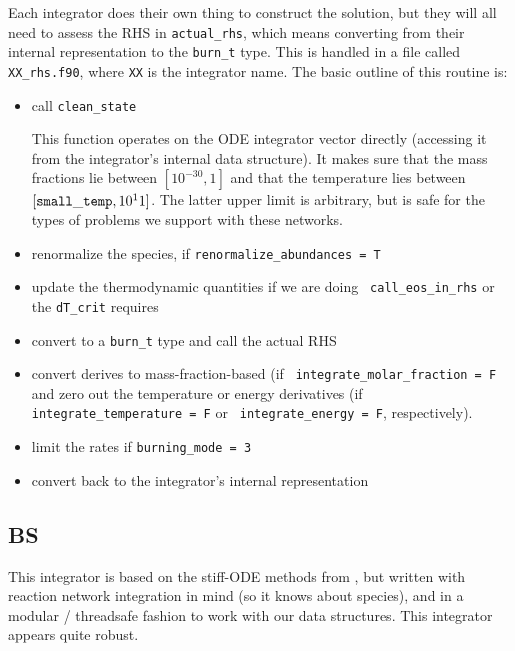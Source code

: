     
Each integrator does their own thing to construct the solution, 
but they will all need to assess the RHS in {\tt actual\_rhs},
which means converting from their internal representation
to the {\tt burn\_t} type.  This is handled in a file
called {\tt XX\_rhs.f90}, where {\tt XX} is the integrator name.
The basic outline of this routine is:
\begin{itemize}
\item call {\tt clean\_state}

This function operates on the ODE integrator vector directly
(accessing it from the integrator's internal data structure).  It
makes sure that the mass fractions lie between $[10^{-30}, 1]$ and
that the temperature lies between $[{\tt small\_temp}, 10^11]$.  The
latter upper limit is arbitrary, but is safe for the types of problems
we support with these networks.


\item renormalize the species, if {\tt renormalize\_abundances = T}

\item update the thermodynamic quantities if we are doing {\tt
  call\_eos\_in\_rhs} or the {\tt dT\_crit} requires

\item convert to a {\tt burn\_t} type and call the actual RHS

\item convert derives to mass-fraction-based (if {\tt
  integrate\_molar\_fraction = F} and zero out the temperature or
  energy derivatives (if {\tt integrate\_temperature = F} or {\tt
    integrate\_energy = F}, respectively).

\item limit the rates if {\tt burning\_mode = 3}

\item convert back to the integrator's internal representation
\end{itemize}


\subsection{BS}
\label{sec:BS}

This integrator is based on the stiff-ODE methods from \cite{NR}, but
written with reaction network integration in mind (so it knows about
species), and in a modular / threadsafe fashion to work with our data
structures.  This integrator appears quite robust.

